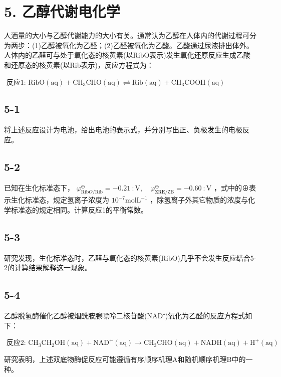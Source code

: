 \section*{5. 乙醇代谢电化学}
人酒量的大小与乙醇代谢能力的大小有关。通常认为乙醇在人体内的代谢过程可分为两步：(1)乙醇被氧化为乙醛；(2)乙醛被氧化为乙酸。乙酸通过尿液排出体外。人体内的乙醛可与处于氧化态的核黄素(以RibO表示)发生氧化还原反应生成乙酸和还原态的核黄素(以Rib表示)，反应方程式为：

$
\text { 反应1: } \mathrm{RibO(aq)} + \mathrm{CH} _ {3} \mathrm{CHO(aq)} \rightleftharpoons \mathrm{Rib(aq)} + \mathrm{CH} _ {3} \mathrm{COOH(aq)}
$

\subsection*{5-1}
将上述反应设计为电池，给出电池的表示式，并分别写出正、负极发生的电极反应。

\subsection*{5-2}
已知在生化标准态下， $\varphi _ { \mathrm { R i b } O / \mathrm { R i b } } ^ { \oplus } = - 0 . 2 1 \ : \mathrm { V } , \quad \varphi _ { \mathrm { Z R E / Z B } } ^ { \oplus } = - 0 . 6 0 \ : \mathrm { V }$ ，式中的⊕表示生化标准态，规定氢离子浓度为 $1 0 ^ { - 7 } \mathrm { m o l } \mathrm { L } ^ { - 1 }$ ，除氢离子外其它物质的浓度与化学标准态的规定相同。计算反应1的平衡常数。

\subsection*{5-3}
研究发现，生化标准态时，乙醛与氧化态的核黄素(RibO)几乎不会发生反应结合5-2的计算结果解释这一现象。

\subsection*{5-4}
乙醇脱氢酶催化乙醇被烟酰胺腺嘌呤二核苷酸(NAD⁺)氧化为乙醛的反应方程式如下：

$
\text { 反应2: } \mathrm{CH} _ {3} \mathrm{CH} _ {2} \mathrm{OH} (\mathrm{aq}) + \mathrm{NAD} ^ {+} (\mathrm{aq}) \rightarrow \mathrm{CH} _ {3} \mathrm{CHO} (\mathrm{aq}) + \mathrm{NADH} (\mathrm{aq}) + \mathrm{H} ^ {+} (\mathrm{aq})
$

研究表明，上述双底物酶促反应可能遵循有序顺序机理A和随机顺序机理B中的一种。

